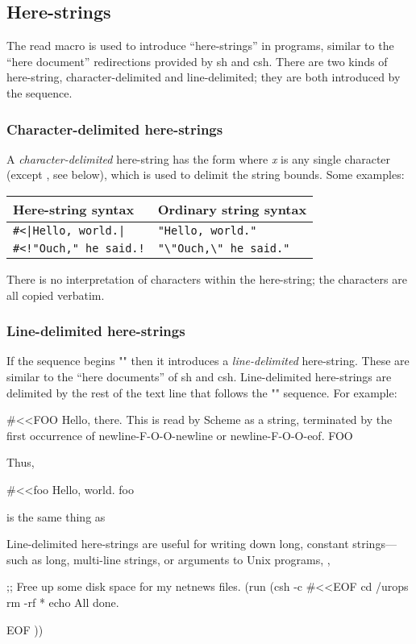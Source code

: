 \subsection{Here-strings}
The read macro  \ex{\#<} is used to introduce ``here-strings''
in programs, similar to the \ex{<<} ``here document'' redirections
provided by sh and csh.
There are two kinds of here-string, character-delimited and line-delimited;
they are both introduced by the \ex{\#<} sequence.

\subsubsection{Character-delimited here-strings}
A \emph{character-delimited} here-string has the form 
where \emph{x} is any single character 
(except \ex{<}, see below),
which is used to delimit the string bounds.
Some examples:
\begin{inset}
\begin{tabular}{ll}
        Here-string syntax              & Ordinary string syntax \\ \hline
        \verb:#<|Hello, world.|:        & \verb:"Hello, world.":        \\
        \verb:#<!"Ouch," he said.!:     & \verb:"\"Ouch,\" he said.":
\end{tabular}
\end{inset}
%
There is no interpretation of characters within the here-string;
the characters are all copied verbatim.

\subsubsection{Line-delimited here-strings}
If the sequence begins "\ex{\#<<}" then it introduces a \emph{line-delimited}
here-string.
These are similar to the ``here documents'' of sh and csh.
Line-delimited here-strings are delimited by the rest of the text line that
follows the "\ex{\#<<}" sequence. 
For example:

\begin{code}
#<<FOO
Hello, there.
This is read by Scheme as a string,
terminated by the first occurrence
of newline-F-O-O-newline or newline-F-O-O-eof.
FOO\end{code}
%
Thus, 
\begin{code}
#<<foo
Hello, world.
foo\end{code}
%
is the same thing as

Line-delimited here-strings are useful for writing down long, constant
strings---such as long, multi-line  strings, 
or arguments to Unix programs, \eg,
\begin{code}
;; Free up some disk space for my netnews files.
(run (csh -c #<<EOF
cd /urops
rm -rf *
echo All done.

EOF
))\end{code}

